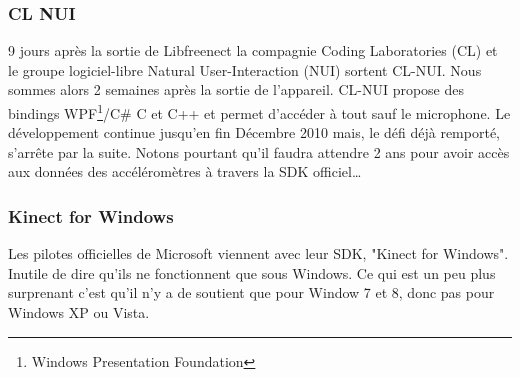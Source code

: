 \subsubsection{CL NUI}
9 jours après la sortie de Libfreenect la compagnie Coding Laboratories 
(CL) et le groupe logiciel-libre
Natural User-Interaction (NUI) sortent CL-NUI. Nous sommes alors 2 semaines 
après la sortie de l'appareil. CL-NUI propose des bindings 
WPF\footnote{Windows Presentation Foundation}/C\# C et C++ et permet d'accéder 
à tout sauf le microphone. Le développement continue jusqu'en fin Décembre 2010 
mais,
le défi déjà remporté, s'arrête par la suite. Notons pourtant qu'il faudra 
attendre 2 ans pour avoir accès aux données des accéléromètres à travers la 
SDK officiel\ldots
\subsubsection{Kinect for Windows}  
Les pilotes officielles de Microsoft viennent avec leur SDK, "Kinect for 
Windows". Inutile de dire
qu'ils ne fonctionnent que sous Windows. Ce qui est un peu plus surprenant 
c'est qu'il n'y a de soutient que pour Window 7 et 8, donc pas pour Windows XP 
ou Vista.
